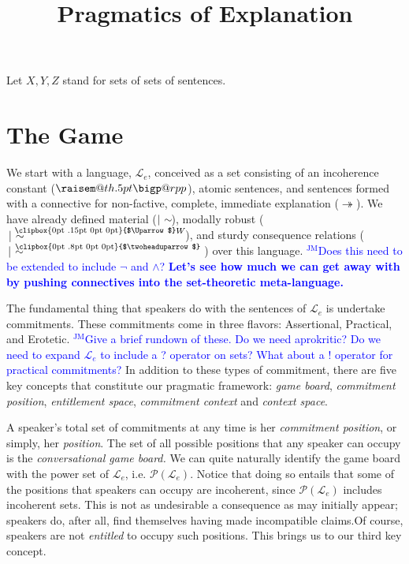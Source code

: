 \documentclass{article}                     %
\makeatletter
\theoremstyle{definition}
\newcommand{\ee}{\twoheadrightarrow}
\newcounter{fncntr}
\newcommand{\fnmark}[1]{\refstepcounter{fncntr}\label{#1}\footnotemark[\getrefnumber{#1}]}
\newcommand{\raisemath}[1]{\mathpalette{\raisem@th{#1}}}
\newcommand{\raisem@th}[3]{\raisebox{#1}{$#2#3$}}
\newcommand{\Uuparrow}{%
	\raisebox{.2ex}{\clipbox{0pt .15pt 0pt 0pt}{$\Uparrow$}}
}
\newcommand{\thuarrow}{%
	\raisebox{.05ex}{\clipbox{0pt .8pt 0pt 0pt}{$\twoheaduparrow$}}
}
\newcommand{\nms}{%
	\mathbin{\mathpalette\@nms\expandafter}
}
\newcommand{\@nms}{\mid\joinrel\mkern-.5mu\sim}
\newcommand{\nmc}{%
	\mathbin{\mathpalette\nm@\expandafter}
}
\newcommand{\nm@}{\mid\joinrel\mkern-.5mu\sim\mkern-3mu}
\newcommand{\mrc}[1]{\mathbin{
		\mathchoice
		{\normalsize\hspace{.5mm}\nms^{\mkern-19mu\scriptsize\Uuparrow#1}\hspace{-.5mm}}
		{\normalsize\hspace{.5mm}\nms^{\mkern-19mu\scriptsize\Uuparrow#1}\hspace{-.5mm}}
		{\footnotesize\hspace{.5mm}\nms^{\mkern-13.5mu\fontsize{5.5}{0}\Uuparrow#1}}
		{\scriptsize\nms^{\mkern-10mu\tiny\Uuparrow#1}}
	}
}
\newcommand{\smc}{\mathbin{
		\mathchoice
		{\hspace{.4mm}\nms^{\mkern-17mu\scriptsize\thuarrow}\hspace{.6mm}}
		{\hspace{.4mm}\nms^{\mkern-17mu\scriptsize\thuarrow}\hspace{.6mm}}
		{\footnotesize\hspace{.4mm}\nms^{\mkern-11mu\tiny\thuarrow}\hspace{.6mm}}
		{\scriptsize\nms^{\mkern-10mu\tiny\thuarrow}}
	}
}
\newcommand{\bigperpp}{%
	\mathop{\mathpalette\bigp@rpp\relax}%
	\displaylimits
}
\newcommand{\bigp@rpp}[2]{%
	\vcenter{
		\m@th\hbox{\scalebox{\ifx#1\displaystyle1.15\else1.15\fi}{$#1\perp$}}
	}%
}
\newcommand{\bigperp}{\raisemath{.5pt}{\bigperpp}}
\newcommand{\jm}[1]{\textcolor{blue}{$^{\textrm{JM}}${#1}}}
\makeatother
\begin{document}
\sloppy
\title{Pragmatics of Explanation}

\raggedbottom

\maketitle




Let $X, Y, Z$ stand for sets of sets of sentences.

\section{The Game}

We start with a language, $ \mathcal{L}_e $, conceived as a set consisting of an incoherence constant ($ \bigperp $), atomic sentences, and sentences formed with a connective for non-factive, complete, immediate explanation ($ \ee $). We have already defined material ($ \nmc $), modally robust ($ \mrc{W} $), and sturdy consequence relations ($ \smc $) over this language. \jm{Does this need to be extended to include $ \neg $ and $ \wedge $? \textbf{Let's see how much we can get away with by pushing connectives into the set-theoretic meta-language.}}

The fundamental thing that speakers do with the sentences of $ \mathcal{L}_e $ is undertake commitments. These commitments come in three flavors: Assertional, Practical, and Erotetic. \jm{Give a brief rundown of these. Do we need aprokritic? Do we need to expand $ \mathcal{L}_e $ to include  a ? operator on sets? What about a ! operator for practical commitments?} In addition to these types of commitment, there are five key concepts that constitute our pragmatic framework: \textit{game board}, \textit{commitment position}, \textit{entitlement space}, \textit{commitment context} and \textit{context space}.

A speaker's total set of commitments at any time is her \textit{commitment position}, or simply, her \textit{position}. The set of all possible positions that any speaker can occupy is the \textit{conversational game board.} We can quite naturally identify the game board with the power set of $ \mathcal{L}_e $, i.e. $\mathcal{P}(\mathcal{L}_e) $. Notice that doing so entails that some of the positions that speakers can occupy are incoherent, since $\mathcal{P}(\mathcal{L}_e)$ includes incoherent sets. This is not as undesirable a consequence as may initially appear; speakers do, after all, find themselves having made incompatible claims.\fnmark{ContrastPW}  Of course, speakers are not \textit{entitled} to occupy such positions. This brings us to our third key concept.
\end{document}
